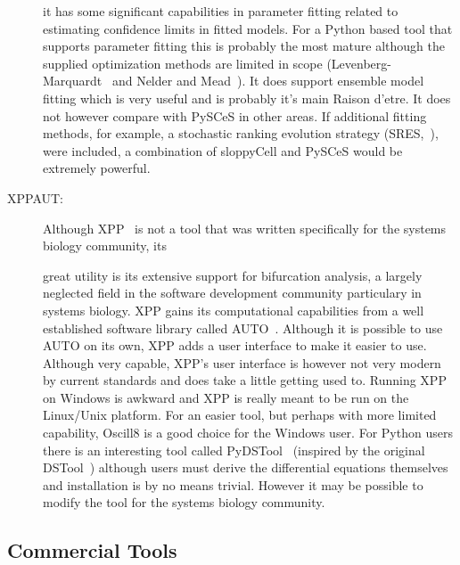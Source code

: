 \documentclass[12pt]{article}
\begin{document}
\begin{description}
it has some significant capabilities in parameter fitting related to
estimating confidence limits in fitted models. For a Python based
tool that supports parameter fitting this is probably the most
mature although the supplied optimization methods are limited in
scope (Levenberg-Marquardt~\citep{levenberg:1944,marquardt:1963} and Nelder and Mead~\citep{nelder:1965}). It does support ensemble model fitting which is very useful and is probably it's
main Raison d'etre. It does not however compare with PySCeS in other
areas. If additional fitting methods, for example, a stochastic
ranking evolution strategy (SRES,~\citet{SRES:2007}), were included, a
combination of sloppyCell and PySCeS would be extremely powerful.
%
\item[XPPAUT:] Although XPP~\citep{XPPAUT:2002} is not a tool that
was written specifically for the systems biology community,  its

great utility is its extensive support for bifurcation analysis, a
largely neglected field in the software development community
particulary in systems biology. XPP gains its computational
capabilities from a well established software library called
AUTO~\citep{Do81}. Although it is possible to use AUTO on its own,
XPP adds a user interface to make it easier to use. Although very
capable, XPP's user interface is however not very modern by current
standards and does take a little getting used to. Running XPP on
Windows is awkward and XPP is really meant to be run on the
Linux/Unix platform. For an easier tool, but perhaps with more
limited capability, Oscill8 is a good choice for the Windows user.
For Python users there is an interesting tool called
PyDSTool~\citep{SloppyCell:2007} (inspired by the original
DSTool~\citep{DSTool:1992}) although users must derive the
differential equations themselves and installation is by no means
trivial. However it may be possible to modify the tool for the
systems biology community.
\end{description}

\subsection{Commercial Tools}
\end{document}
